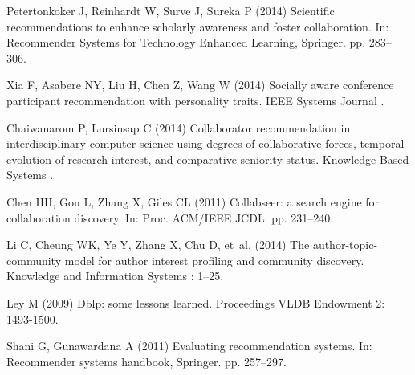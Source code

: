\documentclass[10pt,letterpaper]{article}
\begin{document}
\begin{thebibliography}{10}
Petertonkoker J, Reinhardt W, Surve J, Sureka P (2014) Scientific
  recommendations to enhance scholarly awareness and foster collaboration.
\newblock In: Recommender Systems for Technology Enhanced Learning, Springer.
  pp. 283--306.

Xia F, Asabere NY, Liu H, Chen Z, Wang W (2014) Socially aware conference
  participant recommendation with personality traits.
\newblock IEEE Systems Journal .

Chaiwanarom P, Lursinsap C (2014) Collaborator recommendation in
  interdisciplinary computer science using degrees of collaborative forces,
  temporal evolution of research interest, and comparative seniority status.
\newblock Knowledge-Based Systems .

Chen HH, Gou L, Zhang X, Giles CL (2011) Collabseer: a search engine for
  collaboration discovery.
\newblock In: Proc. ACM/IEEE JCDL. pp. 231--240.

Li C, Cheung WK, Ye Y, Zhang X, Chu D, et~al. (2014) The author-topic-community
  model for author interest profiling and community discovery.
\newblock Knowledge and Information Systems : 1--25.

Ley M (2009) Dblp: some lessons learned.
\newblock Proceedings VLDB Endowment 2: 1493-1500.

Shani G, Gunawardana A (2011) Evaluating recommendation systems.
\newblock In: Recommender systems handbook, Springer. pp. 257--297.

\end{thebibliography}

%
\end{document}
